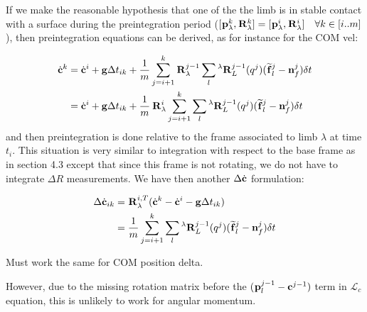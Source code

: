 \documentclass[11pt]{article}
\newcommand{\Rot}[2]{\prescript{#1}{}{\bfR}_{#2}}
\newcommand{\noise}{\bfn}
\newcommand{\posi}[2]{\prescript{#1}{}{\bfp}_{#2}}
\newcommand{\forcem}[2]{\prescript{#1}{}{\widetilde{\bff}}_{#2}}
\newcommand{\AM}{\mathcal{L}}
\newcommand{\COM}{\bfc}
\newcommand{\COMd}{\dot{\bfc}}
\begin{document}
If we make the reasonable hypothesis that one of the the limb is in stable contact with a surface during the preintegration period ($[\posi{}{\lambda}^k, \Rot{}{\lambda}^k ] = [\posi{}{\lambda}^i, \Rot{}{\lambda}^i ] \quad \forall k \in [i..m]$), then preintegration equations can be derived, as for instance for the COM vel:

\begin{equation}
	\begin{split}
	\COMd^{k} &= \COMd^{i} + \bfg \Delta t_{ik} + \frac{1}{m} \sum_{j=i+1}^{k} \Rot{}{\lambda}^{j-1} \sum_l \Rot{\lambda}{L}^{j-1}(q^j) (\forcem{}{l}^{j} - \noise_f^{j}) \delta t
	\\
	&= \COMd^{i} + \bfg \Delta t_{ik} + \frac{1}{m} \Rot{}{\lambda}^{i} \sum_{j=i+1}^{k} \sum_l \Rot{\lambda}{L}^{j-1}(q^j) (\forcem{}{l}^{j} - \noise_f^{j}) \delta t
	\end{split}
\end{equation}
and then preintegration is done relative to the frame associated to limb $\lambda$ at time $t_i$. This situation is very similar to integration with respect to the base frame as in section 4.3 except that since this frame is not rotating, we do not have to integrate $\Delta R$ measurements. We have then another $\Delta \COMd$ formulation:

\begin{equation}
	\begin{split}
	\Delta \COMd_{ik} &= \Rot{}{\lambda}^{i,T}(\COMd^{k} - \COMd^{i} - \bfg \Delta t_{ik})
	\\
	&= \frac{1}{m} \sum_{j=i+1}^{k} \sum_l \Rot{\lambda}{L}^{j-1}(q^j) (\forcem{}{l}^{j} - \noise_f^{j}) \delta t
	\end{split}
\end{equation}

Must work the same for COM position delta.

However, due to the missing rotation matrix before the $(\posi{}{l}^{j-1} - \COM^{j-1})$ term in $\AM_c$ equation, this is unlikely to work for angular momentum.
\end{document}
